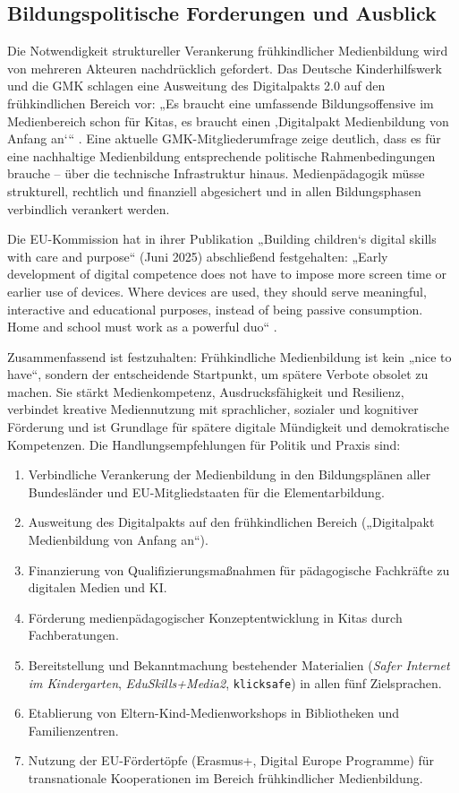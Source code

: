 \documentclass[11pt,a4paper]{article}
\begin{document}
	\subsection{Bildungspolitische Forderungen und Ausblick}
	Die Notwendigkeit struktureller Verankerung frühkindlicher Medienbildung wird von mehreren Akteuren nachdrücklich gefordert. Das Deutsche Kinderhilfswerk und die GMK schlagen eine Ausweitung des Digitalpakts 2.0 auf den frühkindlichen Bereich vor: „Es braucht eine umfassende Bildungsoffensive im Medienbereich schon für Kitas, es braucht einen ‚Digitalpakt Medienbildung von Anfang an‘“ \cite{dkhw2026}. Eine aktuelle GMK-Mitgliederumfrage zeige deutlich, dass es für eine nachhaltige Medienbildung entsprechende politische Rahmenbedingungen brauche – über die technische Infrastruktur hinaus. Medienpädagogik müsse strukturell, rechtlich und finanziell abgesichert und in allen Bildungsphasen verbindlich verankert werden.
	
	Die EU-Kommission hat in ihrer Publikation „Building children‘s digital skills with care and purpose“ (Juni 2025) abschließend festgehalten: „Early development of digital competence does not have to impose more screen time or earlier use of devices. Where devices are used, they should serve meaningful, interactive and educational purposes, instead of being passive consumption. Home and school must work as a powerful duo“ \cite{eucomm2025b}.
	
	Zusammenfassend ist festzuhalten: Frühkindliche Medienbildung ist kein „nice to have“, sondern der entscheidende Startpunkt, um spätere Verbote obsolet zu machen. Sie stärkt Medienkompetenz, Ausdrucksfähigkeit und Resilienz, verbindet kreative Mediennutzung mit sprachlicher, sozialer und kognitiver Förderung und ist Grundlage für spätere digitale Mündigkeit und demokratische Kompetenzen. Die Handlungsempfehlungen für Politik und Praxis sind:
	
	\begin{enumerate}[nosep]
		\item Verbindliche Verankerung der Medienbildung in den Bildungsplänen aller Bundesländer und EU-Mitgliedstaaten für die Elementarbildung.
		\item Ausweitung des Digitalpakts auf den frühkindlichen Bereich („Digitalpakt Medienbildung von Anfang an“).
		\item Finanzierung von Qualifizierungsmaßnahmen für pädagogische Fachkräfte zu digitalen Medien und KI.
		\item Förderung medienpädagogischer Konzeptentwicklung in Kitas durch Fachberatungen.
		\item Bereitstellung und Bekanntmachung bestehender Materialien (\textit{Safer Internet im Kindergarten}, \textit{EduSkills+Media2}, \texttt{klicksafe}) in allen fünf Zielsprachen.
		\item Etablierung von Eltern-Kind-Medienworkshops in Bibliotheken und Familienzentren.
		\item Nutzung der EU-Fördertöpfe (Erasmus+, Digital Europe Programme) für transnationale Kooperationen im Bereich frühkindlicher Medienbildung.
	\end{enumerate}
	
\end{document}
